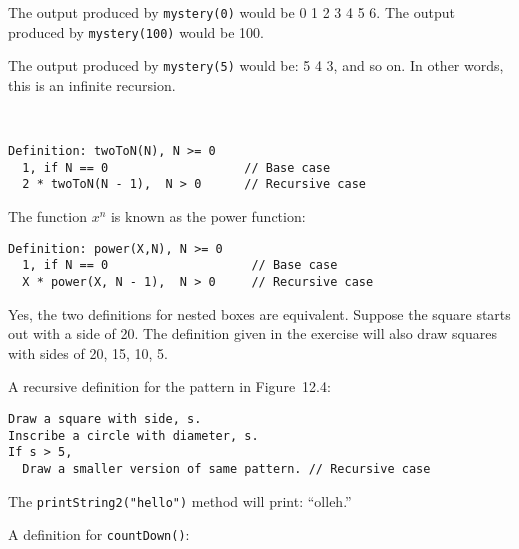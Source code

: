 \secANSHleft

\begin{ANS}

\item The output produced by {\tt mystery(0)} would be 0 1 2 3 4 5 6.
The output produced by {\tt mystery(100)} would be 100.

\item  The output produced by {\tt mystery(5)} would be: 5 4 3, and so
on.  In other words, this is an infinite recursion.  

\item \mbox{ }
\begin{jjjlisting}
\begin{lstlisting}
Definition: twoToN(N), N >= 0
  1, if N == 0                   // Base case
  2 * twoToN(N - 1),  N > 0      // Recursive case
\end{lstlisting}
\end{jjjlisting}

\item  The function $x^n$ is known as the power function:

\begin{jjjlisting}
\begin{lstlisting}
Definition: power(X,N), N >= 0
  1, if N == 0                    // Base case
  X * power(X, N - 1),  N > 0     // Recursive case
\end{lstlisting}
\end{jjjlisting}

\item  Yes, the two definitions for nested boxes are equivalent.  Suppose
the square starts out with a side of 20. The definition given in
the exercise will also draw squares with sides of 20, 15, 10, 5.

\item  A recursive definition for the pattern in Figure~12.4:

\begin{jjjlisting}
\begin{lstlisting}
Draw a square with side, s.
Inscribe a circle with diameter, s.
If s > 5,
  Draw a smaller version of same pattern. // Recursive case
\end{lstlisting}
\end{jjjlisting}

\item  The {\tt printString2("hello")} method will print: ``olleh.''

\item  A definition for {\tt countDown()}:


\end{ANS}
